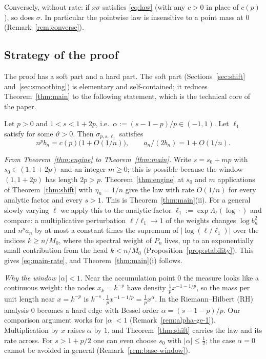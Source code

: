 \begin{remark}\label{rem:shift-converse}
Conversely, without rate: if $x\sigma$ satisfies \eqref{eq:law} (with any $c>0$ in place of $c(p)$), so does
$\sigma$. In particular the pointwise law is insensitive to a point mass at $0$ (Remark~\ref{rem:converse}).
\end{remark}

\subsection{Strategy of the proof}\label{sec:strategy}
The proof has a soft part and a hard part. The soft part (Sections~\ref{sec:shift} and~\ref{sec:smoothing}) is
elementary and self-contained; it reduces Theorem~\ref{thm:main} to the following statement, which is the technical
core of the paper.

\begin{maintheorem}\label{thm:engine}
Let $p>0$ and $1<s<1+2p$, i.e.\ $\alpha:=(s-1-p)/p\in(-1,1)$. Let $\ell_1$ satisfy \Ath{\vartheta} for some
$\vartheta>0$. Then
$\sigma_{p,s,\ell_1}$ satisfies
\[
  n^pb_n=c(p)\bigl(1+O(1/n)\bigr),\qquad a_n/(2b_n)=1+O(1/n).
\]
\end{maintheorem}

\emph{From Theorem~\ref{thm:engine} to Theorem~\ref{thm:main}.} Write $s=s_0+mp$ with $s_0\in(1,1+2p)$ and an
integer $m\ge0$; this is possible because the window $(1,1+2p)$ has length $2p>p$. Theorem~\ref{thm:engine} at $s_0$
and $m$ applications of Theorem~\ref{thm:shift} with $\eta_n=1/n$ give the law with rate $O(1/n)$ for every analytic
factor and every $s>1$. This is Theorem~\ref{thm:main}(ii). For a general slowly varying $\ell$ we apply this to the
analytic factor $\ell_1:=\exp\Lambda_\ell(\log\cdot)$ and compare: a multiplicative perturbation $\ell/\ell_1\to1$ of
the weights changes $\log b_n^2$ and $n^pa_n$ by at most a constant times the supremum of $|\log(\ell/\ell_1)|$ over
the indices $k\ge n/M_0$, where the spectral weight of $P_n$ lives, up to an exponentially small contribution from the
head $k<n/M_0$ (Proposition~\ref{prop:stability}). This gives \eqref{eq:main-rate}, and Theorem~\ref{thm:main}(i)
follows.

\emph{Why the window $|\alpha|<1$.} Near the accumulation point $0$ the measure looks like a continuous weight: the
nodes $x_k=k^{-p}$ have density $\frac1px^{-1-1/p}$, so the mass per unit length near $x=k^{-p}$ is
$k^{-s}\cdot\frac1px^{-1-1/p}=\frac1px^{\alpha}$. In the Riemann--Hilbert (RH) analysis $0$ becomes a hard edge with Bessel order
$\alpha=(s-1-p)/p$. Our comparison argument works for $|\alpha|<1$ (Remark~\ref{rem:alpha-ge-1}). Multiplication by
$x$ raises $\alpha$ by $1$, and Theorem~\ref{thm:shift} carries the law and its rate across. For $s>1+p/2$ one can
even choose $s_0$ with $|\alpha|\le\frac12$; the case $\alpha=0$ cannot be avoided in general
(Remark~\ref{rem:base-window}).

